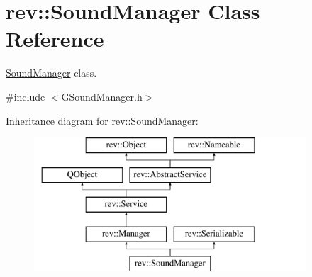 \hypertarget{classrev_1_1_sound_manager}{}\section{rev\+::Sound\+Manager Class Reference}
\label{classrev_1_1_sound_manager}


\mbox{\hyperlink{classrev_1_1_sound_manager}{Sound\+Manager}} class.  




{\ttfamily \#include $<$G\+Sound\+Manager.\+h$>$}

Inheritance diagram for rev\+::Sound\+Manager\+:\begin{figure}[H]
\begin{center}
\leavevmode
\includegraphics[height=5.000000cm]{classrev_1_1_sound_manager}
\end{center}
\end{figure}
